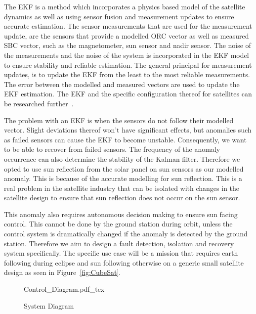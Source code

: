 \documentclass[letterpaper, 10 pt, conference]{ieeeconf}  %
\begin{document}
The EKF is a method which incorporates a physics based model of the satellite dynamics as well as using sensor fusion and measurement updates to ensure accurate estimation. The sensor measurements that are used for the measurement update, are the sensors that provide a modelled ORC vector as well as measured SBC vector, such as the magnetometer, sun sensor and nadir sensor. The noise of the measurements and the noise of the system is incorporated in the EKF model to ensure stability and reliable estimation. The general principal for measurement updates, is to update the EKF from the least to the most reliable measurements. The error between the modelled and measured vectors are used to update the EKF estimation. The EKF and the specific configuration thereof for satellites can be researched further~\cite{JansevanVuuren2015}. 

The problem with an EKF is when the sensors do not follow their modelled vector. Slight deviations thereof won't have significant effects, but anomalies such as failed sensors can cause the EKF to become unstable. Consequently, we want to be able to recover from failed sensors. The frequency of the anomaly occurrence can also determine the stability of the Kalman filter. Therefore we opted to use sun reflection from the solar panel on sun sensors as our modelled anomaly. This is because of the accurate modelling for sun reflection. This is a real problem in the satellite industry that can be isolated with changes in the satellite design to ensure that sun reflection does not occur on the sun sensor.

This anomaly also requires autonomous decision making to ensure sun facing control. This cannot be done by the ground station during orbit, unless the control system is dramatically changed if the anomaly is detected by the ground station. Therefore we aim to design a fault detection, isolation and recovery system specifically. The specific use case will be a mission that requires earth following during eclipse and sun following otherwise on a generic small satellite design as seen in Figure~\ref{fig:CubeSat}.

\begin{figure*}[h!b!t]
	\centering
	\def\svgwidth{14cm}
	{Control_Diagram.pdf_tex}
	\caption{System Diagram}
	\label{fig:System_Diagram}
\end{figure*}
\end{document}
